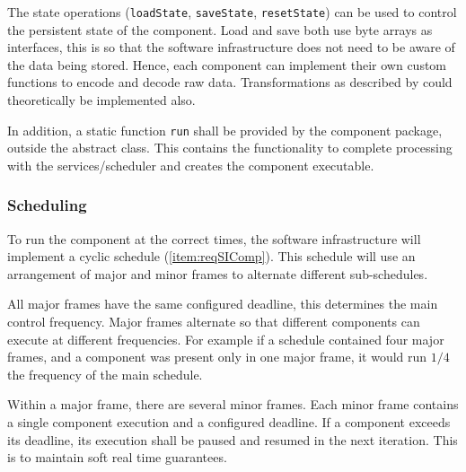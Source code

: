 The state operations (\verb|loadState|, \verb|saveState|, \verb|resetState|) can be used to control the persistent state of the component. Load and save both use byte arrays as interfaces, this is so that the software infrastructure does not need to be aware of the data being stored. Hence, each component can implement their own custom functions to encode and decode raw data. Transformations as described by \textcite{wahlerDisruptionfreeSoftwareUpdates2014} could theoretically be implemented also.

In addition, a static function \verb|run| shall be provided by the component package, outside the abstract class. This contains the functionality to complete processing with the services/scheduler and creates the component executable.

\clearpage

\subsubsection{Scheduling}
To run the component at the correct times, the software infrastructure will implement a cyclic schedule (\ref{item:reqSIComp}). This schedule will use an arrangement of major and minor frames to alternate different sub-schedules. 

All major frames have the same configured deadline, this determines the main control frequency. Major frames alternate so that different components can execute at different frequencies. For example if a schedule contained four major frames, and a component was present only in one major frame, it would run $1/4$ the frequency of the main schedule.

Within a major frame, there are several minor frames. Each minor frame contains a single component execution and a configured deadline. If a component exceeds its deadline, its execution shall be paused and resumed in the next iteration. This is to maintain soft real time guarantees.

